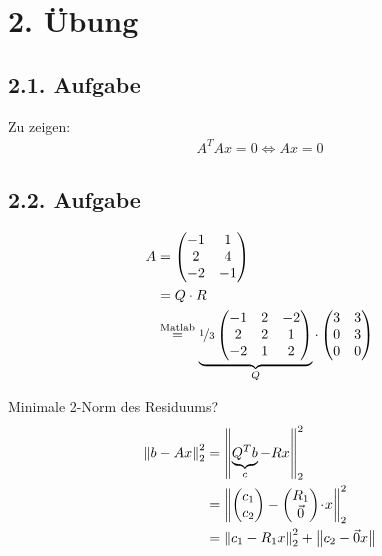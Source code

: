 \section*{2. Übung}
\subsection*{2.1. Aufgabe}
Zu zeigen:
\begin{equation}\begin{split}
	A^TAx = 0 \Leftrightarrow Ax = 0
\end{split}\end{equation}


\subsection*{2.2. Aufgabe}
\begin{equation}\begin{split}
	A &= \begin{pmatrix}
		-1 & 1\\
		2 & 4\\
		-2 & -1
	\end{pmatrix}\\
	&= Q\cdot R\\
	&\stackrel{\text{\lstinline|Matlab|}}{=}
	\underbrace{
		\nicefrac{1}{3}\begin{pmatrix}
		-1&2&-2\\
		2&2&1\\
		-2&1&2
	\end{pmatrix}}_{Q}
	\cdot
	\begin{pmatrix*}
		3&3\\
		0&3\\
		0&0
	\end{pmatrix*}
\end{split}\end{equation}

Minimale 2-Norm des Residuums?
\begin{equation}\begin{split}
	\left\lVert b-Ax\right\rVert_2^2 &= \left\lVert\underbrace{Q^Tb}_{c} -Rx\right\rVert_2^2\\
	&=
	\left\lVert\begin{pmatrix}
			c_1\\
			c_2
		\end{pmatrix}
		-\begin{pmatrix}
			R_1\\
			\vec{0}
		\end{pmatrix}
		\!\cdot\! x
	\right\rVert_2^2 \\
	&= \left\lVert c_1 -R_1x\right\rVert_2^2 + \left\lVert c_2 -\vec{0}x\right\rVert\\
\end{split}\end{equation}


